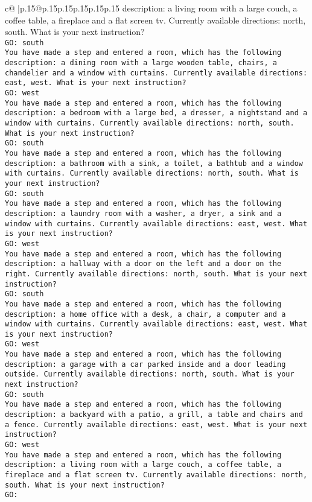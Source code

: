 \documentclass{article}
\begin{document}
{\begin{supertabular}{c@{$\;$}|p{.15\linewidth}@{}p{.15\linewidth}p{.15\linewidth}p{.15\linewidth}p{.15\linewidth}p{.15\linewidth}}
{{{description: a living room with a large couch, a coffee table, a fireplace and a flat screen tv. Currently available directions: north, south. What is your next instruction?\\ \tt GO: south\\ \tt You have made a step and entered a room, which has the following description: a dining room with a large wooden table, chairs, a chandelier and a window with curtains. Currently available directions: east, west. What is your next instruction?\\ \tt GO: west\\ \tt You have made a step and entered a room, which has the following description: a bedroom with a large bed, a dresser, a nightstand and a window with curtains. Currently available directions: north, south. What is your next instruction?\\ \tt GO: south\\ \tt You have made a step and entered a room, which has the following description: a bathroom with a sink, a toilet, a bathtub and a window with curtains. Currently available directions: north, south. What is your next instruction?\\ \tt GO: south\\ \tt You have made a step and entered a room, which has the following description: a laundry room with a washer, a dryer, a sink and a window with curtains. Currently available directions: east, west. What is your next instruction?\\ \tt GO: west\\ \tt You have made a step and entered a room, which has the following description: a hallway with a door on the left and a door on the right. Currently available directions: north, south. What is your next instruction?\\ \tt GO: south\\ \tt You have made a step and entered a room, which has the following description: a home office with a desk, a chair, a computer and a window with curtains. Currently available directions: east, west. What is your next instruction?\\ \tt GO: west\\ \tt You have made a step and entered a room, which has the following description: a garage with a car parked inside and a door leading outside. Currently available directions: north, south. What is your next instruction?\\ \tt GO: south\\ \tt You have made a step and entered a room, which has the following description: a backyard with a patio, a grill, a table and chairs and a fence. Currently available directions: east, west. What is your next instruction?\\ \tt GO: west\\ \tt You have made a step and entered a room, which has the following description: a living room with a large couch, a coffee table, a fireplace and a flat screen tv. Currently available directions: north, south. What is your next instruction?\\ \tt GO: }}}
\end{supertabular}}
\end{document}
